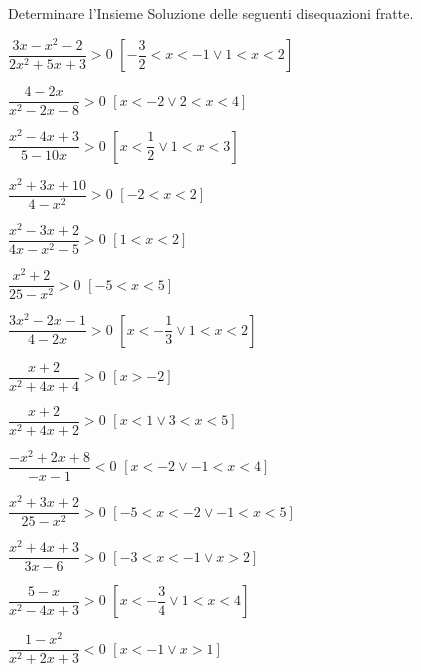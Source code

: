 \begin{esercizio}[\Ast]
 \label{ese:4.61}
Determinare l'Insieme Soluzione delle seguenti disequazioni fratte.
\begin{multicols}{2}
\begin{enumeratea}
\item \(\dfrac{3x-x^2-2}{2x^2+5x+3}>0\) \hfill \(\left[-\dfrac 3 2<x<-1\vee 
1<x<2\right]\)
\item \(\dfrac{4-2x}{x^2-2x-8}>0\) \hfill \(\left[x<-2\vee 2<x<4\right]\)
\item \(\dfrac{x^2-4x+3}{5-10x}>0\) \hfill \(\left[x<\dfrac 1 2\vee 
1<x<3\right]\)
\item \(\dfrac{x^2+3x+10}{4-x^2}>0\) \hfill \(\left[-2<x<2\right]\)
\item \(\dfrac{x^2-3x+2}{4x-x^2-5}>0\) \hfill \(\left[1<x<2\right]\)
\item \(\dfrac{x^2+2}{25-x^2}>0\) \hfill \(\left[-5<x<5\right]\)
\item \(\dfrac{3x^2-2x-1}{4-2x}>0\) \hfill \(\left[x<-\dfrac 1 3\vee 
1<x<2\right]\)
\item \(\dfrac{x+2}{x^2+4x+4}>0\) \hfill \(\left[x>-2\right]\)
\item \(\dfrac{x+2}{x^2+4x+2}>0\) \hfill \(\left[x<1\vee 3<x<5\right]\)
\item \(\dfrac{-x^2+2x+8}{-x-1}<0\) \hfill \(\left[x<-2\vee -1<x<4\right]\)
\item \(\dfrac{x^2+3x+2}{25-x^2}>0\) \hfill \(\left[-5<x<-2\vee 
-1<x<5\right]\)
\item \(\dfrac{x^2+4x+3}{3x-6}>0\) \hfill \(\left[-3<x<-1\vee x>2\right]\)
\item \(\dfrac{5-x}{x^2-4x+3}>0\) \hfill \(\left[x<-\dfrac 3 4\vee 
1<x<4\right]\)
\item \(\dfrac{1-x^2}{x^2+2x+3}<0\) \hfill \(\left[x<-1\vee x>1\right]\)
\end{enumeratea}
\end{multicols}
\end{esercizio}

\pagebreak %

